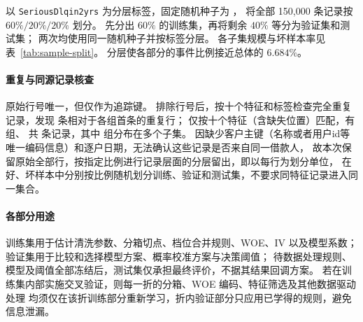 

以 \texttt{SeriousDlqin2yrs} 为分层标签，固定随机种子为 \SplitSeed，
将全部 150,000 条记录按 $60\%/20\%/20\%$ 划分。
先分出 $60\%$ 的训练集，再将剩余 $40\%$ 等分为验证集和测试集；
两次均使用同一随机种子并按标签分层。
各子集规模与坏样本率见表~\ref{tab:sample-split}。
分层使各部分的事件比例接近总体的 $6.684\%$。

\begin{table}[htbp]
  \centering
  \caption{固定分层随机划分的样本构成（坏样本为正类）}
  \label{tab:sample-split}
  \small
  
\end{table}

\paragraph{重复与同源记录核查}
原始行号唯一，但仅作为追踪键。
排除行号后，按十个特征和标签检查完全重复记录，发现
\LabeledDuplicateExcess{} 条相对于各组首条的重复行；
仅按十个特征（含缺失位置）匹配，有 \FeatureDuplicateGroups{} 组、
共 \FeatureDuplicateRows{} 条记录，其中 \CrossSplitFeatureGroups{} 组分布在多个子集。
因缺少客户主键（名称或者用户id等唯一编码信息）和逐户日期，无法确认这些记录是否来自同一借款人，
故本次保留原始全部行，按指定比例进行记录层面的分层留出，即以每行为划分单位，
在好、坏样本中分别按比例随机划分训练、验证和测试集，不要求同特征记录进入同一集合。


\paragraph{各部分用途}
训练集用于估计清洗参数、分箱切点、档位合并规则、WOE、IV 以及模型系数；
验证集用于比较和选择模型方案、概率校准方案与决策阈值；
待数据处理规则、模型及阈值全部冻结后，测试集仅承担最终评价，不据其结果回调方案。
若在训练集内部实施交叉验证，则每一折的分箱、WOE 编码、特征筛选及其他数据驱动处理
均须仅在该折训练部分重新学习，折内验证部分只应用已学得的规则，避免信息泄漏。
